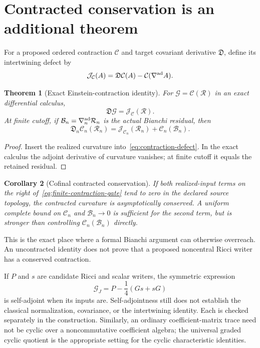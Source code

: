 \documentclass[11pt,a4paper,oneside]{book}
\theoremstyle{plain}
\newtheorem{theorem}{Theorem}[chapter]
\newtheorem{corollary}[theorem]{Corollary}
\theoremstyle{definition}
\theoremstyle{remark}
\newcommand{\src}[2]{\cite{#1}}
\begin{document}
\section{Contracted conservation is an additional theorem}
For a proposed ordered contraction $\mathcal C$ and target covariant derivative $\mathfrak D$, define its intertwining defect by
\begin{equation}
 \mathcal J_{\mathcal C}(A)
 =\mathfrak D\mathcal C(A)-\mathcal C(\nabla^{\rm ad}A).
 \label{eq:contraction-defect}
\end{equation}

\begin{theorem}[Exact Einstein-contraction identity]
\label{thm:einstein-contraction}
For $\mathcal G=\mathcal C(\mathcal R)$ in an exact differential calculus,
\begin{equation}
 \mathfrak D\mathcal G=\mathcal J_{\mathcal C}(\mathcal R).
 \label{eq:contraction-gate}
\end{equation}
At finite cutoff, if $\mathcal B_n=\nabla_n^{\rm ad}\mathcal R_n$ is the actual Bianchi residual, then
\begin{equation}
 \mathfrak D_n\mathcal C_n(\mathcal R_n)
 =\mathcal J_{\mathcal C_n}(\mathcal R_n)+\mathcal C_n(\mathcal B_n).
 \label{eq:finite-contraction-gate}
\end{equation}
\end{theorem}
\begin{proof}
Insert the realized curvature into~\eqref{eq:contraction-defect}. In the exact calculus the adjoint derivative of curvature vanishes; at finite cutoff it equals the retained residual.
\end{proof}
\src{R13}{thm:v13v96-gate}

\begin{corollary}[Cofinal contracted conservation]
If both realized-input terms on the right of~\eqref{eq:finite-contraction-gate} tend to zero in the declared source topology, the contracted curvature is asymptotically conserved. A uniform complete bound on $\mathcal C_n$ and $\mathcal B_n\to0$ is sufficient for the second term, but is stronger than controlling $\mathcal C_n(\mathcal B_n)$ directly.
\end{corollary}
\src{R13}{cor:v13v96-cofinal}
This is the exact place where a formal Bianchi argument can otherwise overreach. An uncontracted identity does not prove that a proposed noncentral Ricci writer has a conserved contraction.

If $P$ and $s$ are candidate Ricci and scalar writers, the symmetric expression
\begin{equation}
 \mathcal G_J=P-\frac14(Gs+sG)
 \label{eq:jordan-einstein}
\end{equation}
is self-adjoint when its inputs are. Self-adjointness still does not establish the classical normalization, covariance, or the intertwining identity. Each is checked separately in the construction. Similarly, an ordinary coefficient-matrix trace need not be cyclic over a noncommutative coefficient algebra; the universal graded cyclic quotient is the appropriate setting for the cyclic characteristic identities. \cite{R13}
\end{document}
